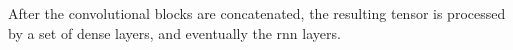 
After the convolutional blocks are concatenated, the
resulting tensor is processed by a set of dense layers,
and eventually the \gls{rnn} layers.
